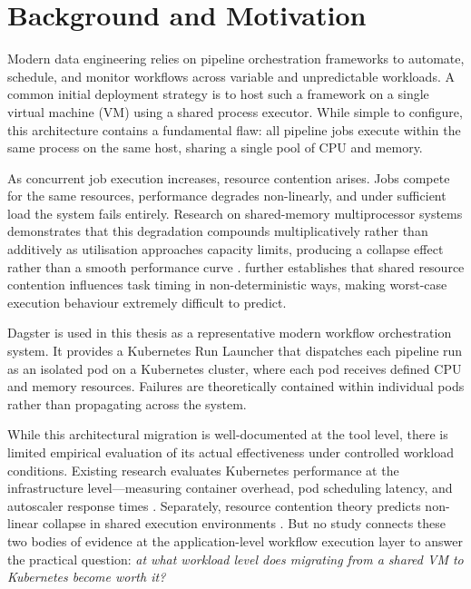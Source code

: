 
\section{Background and Motivation}
\label{sec:background}

Modern data engineering relies on pipeline orchestration frameworks to automate, schedule, and monitor workflows across variable and unpredictable workloads. A common initial deployment strategy is to host such a framework on a single virtual machine (VM) using a shared process executor. While simple to configure, this architecture contains a fundamental flaw: all pipeline jobs execute within the same process on the same host, sharing a single pool of CPU and memory.

As concurrent job execution increases, resource contention arises. Jobs compete for the same resources, performance degrades non-linearly, and under sufficient load the system fails entirely. Research on shared-memory multiprocessor systems demonstrates that this degradation compounds multiplicatively rather than additively as utilisation approaches capacity limits, producing a collapse effect rather than a smooth performance curve \citep{nanda1991}. \citet{arora2023} further establishes that shared resource contention influences task timing in non-deterministic ways, making worst-case execution behaviour extremely difficult to predict.

Dagster is used in this thesis as a representative modern workflow orchestration system. It provides a Kubernetes Run Launcher that dispatches each pipeline run as an isolated pod on a Kubernetes cluster, where each pod receives defined CPU and memory resources. Failures are theoretically contained within individual pods rather than propagating across the system.

While this architectural migration is well-documented at the tool level, there is limited empirical evaluation of its actual effectiveness under controlled workload conditions. Existing research evaluates Kubernetes performance at the infrastructure level---measuring container overhead, pod scheduling latency, and autoscaler response times \citep{casalicchio2019, nguyen2020, choi2021}. Separately, resource contention theory predicts non-linear collapse in shared execution environments \citep{nanda1991, arora2023}. But no study connects these two bodies of evidence at the application-level workflow execution layer to answer the practical question: \emph{at what workload level does migrating from a shared VM to Kubernetes become worth it?}
